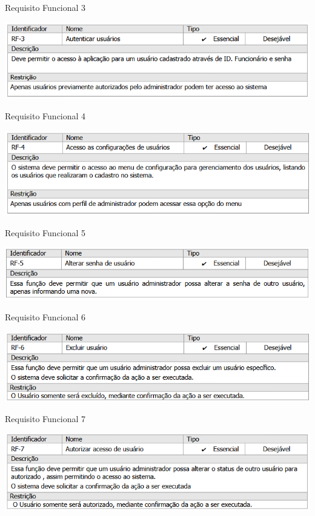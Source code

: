 \begin{table}[h]
    \caption{Requisito Funcional 3}
    \centering
    \includegraphics[scale=0.9]{imagens/rf03.png}
    \label{tab:rf03}
\end{table}

\begin{table}[h]
    \caption{Requisito Funcional 4}
    \centering
    \includegraphics[scale=0.9]{imagens/rf04.png}
    \label{tab:rf04}
\end{table}

\begin{table}[h]
    \caption{Requisito Funcional 5}
    \centering
    \includegraphics[scale=0.9]{imagens/rf05.png}
    \label{tab:rf05}
\end{table}

\begin{table}[h]
    \caption{Requisito Funcional 6}
    \centering
    \includegraphics[scale=0.9]{imagens/rf06.png}
    \label{tab:rf06}
\end{table}

\begin{table}[h]
    \caption{Requisito Funcional 7}
    \centering
    \includegraphics[scale=0.9]{imagens/rf07.png}
    \label{tab:rf07}
\end{table}

